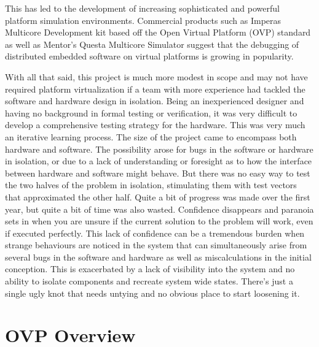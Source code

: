 This has led to the development of increasing sophisticated and powerful platform simulation environments. Commercial products such as Imperas Multicore Development kit based off the Open Virtual Platform (OVP) standard as well as Mentor's Questa Multicore Simulator suggest that the debugging of distributed embedded software on virtual platforms is growing in popularity. 

With all that said, this project is much more modest in scope and may not have required platform virtualization if a team with more experience had tackled the software and hardware design in isolation. Being an inexperienced designer and having no background in formal testing or verification, it was very difficult to develop a comprehensive testing strategy for the hardware. This was very much an iterative learning process. The size of the project came to encompass both hardware and software. The possibility arose for bugs in the software or hardware in isolation, or due to a lack of understanding or foresight as to how the interface between hardware and software might behave. But there was no easy way to test the two halves of the problem in isolation, stimulating them with test vectors that approximated the other half. Quite a bit of progress was made over the first year, but quite a bit of time was also wasted. Confidence disappears and paranoia sets in when you are unsure if the current solution to the problem will work, even if executed perfectly. This lack of confidence can be a tremendous burden when strange behaviours are noticed in the system that can simultaneously arise from several bugs in the software and hardware as well as miscalculations in the initial conception. This is exacerbated by a lack of visibility into the system and no ability to isolate components and recreate system wide states. There's just a single ugly knot that needs untying and no obvious place to start loosening it.

\section{OVP Overview}

